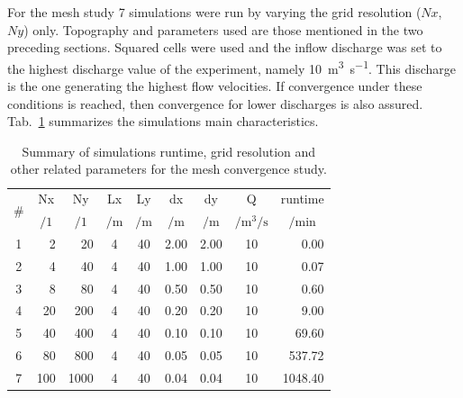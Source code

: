 For the mesh study \num{7} simulations were run by varying the grid resolution ($Nx$, $Ny$) only. 
Topography and parameters used are those mentioned in the two preceding sections.
Squared cells were used and the inflow discharge was set to the highest discharge value of the experiment, namely \SI{10}{\cubic\meter\per\second}.
This discharge is the one generating the highest flow velocities.
If convergence under these conditions is reached, then convergence for lower discharges is also assured.
Tab.~\ref{tab:mesh_study} summarizes the simulations main characteristics.

\begin{table}[h]
  \centering
  \caption{Summary of simulations runtime, grid resolution and other related parameters for the mesh convergence study.}
  \label{tab:mesh_study}
  \begin{tabular}{crrcccccr}
    \toprule
    \multirow{2}{*}{\#} & \multicolumn{1}{c}{Nx} & \multicolumn{1}{c}{Ny} & \multicolumn{1}{c}{Lx} & \multicolumn{1}{c}{Ly} & \multicolumn{1}{c}{dx} & \multicolumn{1}{c}{dy} & \multicolumn{1}{c}{Q} & \multicolumn{1}{c}{runtime} \\
       & \multicolumn{1}{c}{$/1$} & \multicolumn{1}{c}{$/1$} & \multicolumn{1}{c}{$/\si{\meter}$} & \multicolumn{1}{c}{$/\si{\m}$} & \multicolumn{1}{c}{$/\si{\m}$} & \multicolumn{1}{c}{$/\si{\m}$} & \multicolumn{1}{c}{$/\si{\cubic\m\per\s}$} & \multicolumn{1}{c}{$/\si{\minute}$} \\ 
    \midrule
    1  & 2             & 20            & 4               & 40          & 2.00        & 2.00        & 10                      & 0.00 \\
    2  & 4             & 40            & 4               & 40          & 1.00        & 1.00        & 10                      & 0.07 \\
    3  & 8             & 80            & 4               & 40          & 0.50        & 0.50        & 10                      & 0.60 \\
    4  & 20            & 200           & 4               & 40          & 0.20        & 0.20        & 10                      & 9.00 \\
    5  & 40            & 400           & 4               & 40          & 0.10        & 0.10        & 10                      & 69.60 \\
    6  & 80            & 800           & 4               & 40          & 0.05        & 0.05        & 10                      & 537.72 \\
    7  & 100           & 1000         & 4               & 40          & 0.04        & 0.04        & 10                      & 1048.40 \\
    \bottomrule
  \end{tabular}
\end{table} 

